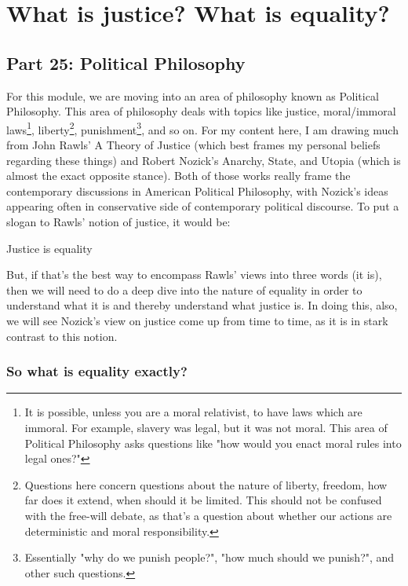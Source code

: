 \part{What is justice? What is equality?}
\label{ch.modeleven}
\chapter{Part 25: Political Philosophy}


For this module, we are moving into an area of philosophy known as Political Philosophy. This area of philosophy deals with topics like justice, moral/immoral laws\footnote{It is possible, unless you are a moral relativist, to have laws which are immoral. For example, slavery was legal, but it was not moral. This area of Political Philosophy asks questions like "how would you enact moral rules into legal ones?"}, liberty\footnote{Questions here concern questions about the nature of liberty, freedom, how far does it extend, when should it be limited. This should not be confused with the free-will debate, as that's a question about whether our actions are deterministic and moral responsibility.}, punishment\footnote{Essentially "why do we punish people?", "how much should we punish?", and other such questions.}, and so on. For my content here, I am drawing much from John Rawls' A Theory of Justice (which best frames my personal beliefs regarding these things) and Robert Nozick's Anarchy, State, and Utopia (which is almost the exact opposite stance). Both of those works really frame the contemporary discussions in American Political Philosophy, with Nozick's ideas appearing often in conservative side of contemporary political discourse. To put a slogan to Rawls' notion of justice, it would be:
\begin{center}
Justice is equality
\end{center}
But, if that's the best way to encompass Rawls' views into three words (it is), then we will need to do a deep dive into the nature of equality in order to understand what it is and thereby understand what justice is. In doing this, also, we will see Nozick's view on justice come up from time to time, as it is in stark contrast to this notion.
\section{So what is equality exactly?}

